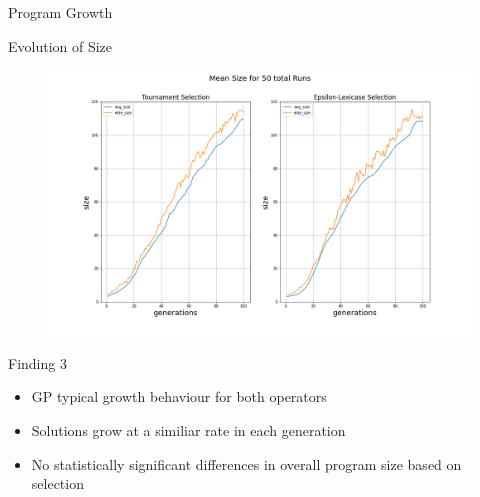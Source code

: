 \documentclass[
  ignorenonframetext,
]{beamer}
\providecommand{\tightlist}{%
  \setlength{\itemsep}{0pt}\setlength{\parskip}{0pt}}
\begin{document}
\begin{frame}{Program Growth}
\protect\hypertarget{program-growth}{}
\end{frame}

\begin{frame}{Evolution of Size}
\protect\hypertarget{evolution-of-size}{}
\begin{figure}
\centering
\includegraphics{../plots/size_subplotted.png}
\end{figure}
\end{frame}

\begin{frame}{Finding 3}
\protect\hypertarget{finding-3}{}
\begin{itemize}
\tightlist
\item
  GP typical growth behaviour for both operators
\item
  Solutions grow at a similiar rate in each generation
\item
  No statistically significant differences in overall program size based
  on selection
\end{itemize}
\end{frame}
\end{document}
